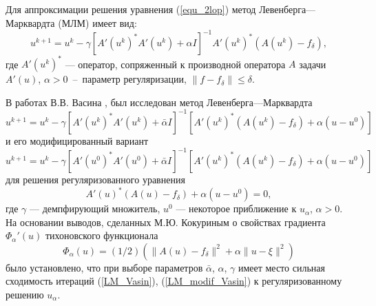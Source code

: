 Для аппроксимации решения уравнения (\ref{equ_2lop}) метод Левенберга---Марквардта (МЛМ) имеет вид:
\begin{equation}
u^{k+1}=u^k-\gamma[A'(u^k)^*A'(u^k)+\alpha I]^{-1} A'(u^k)^*(A(u^k)-f_\delta),
\end{equation}
где $A'(u^k)^*$ --- оператор, сопряженный к производной оператора $A$ задачи $A'(u)$, $\alpha>0$~--~параметр регуляризации, $\|f-f_\delta\|\le \delta.$
 
В работах В.В. Васина \cite{Vasin_2012}, \cite{VasPer_2011} был исследован метод Левенберга---Марквардта
\begin{equation}\label{LM_Vasin}
u^{k+1}=u^k-\gamma[A'(u^k)^*A'(u^k)+\bar{\alpha} I]^{-1} [A'(u^k)^*(A(u^k)-f_\delta)+\alpha (u-u^0)]
\end{equation} и его модифицированный вариант
\begin{equation}\label{LM_modif_Vasin}
u^{k+1}=u^k-\gamma[A'(u^0)^*A'(u^0)+\bar{\alpha} I]^{-1} [A'(u^k)^*(A(u^k)-f_\delta)+\alpha (u-u^0)]
\end{equation} для решения регуляризованного уравнения
$$A'(u)^*(A(u)-f_\delta)+	\alpha (u-u^0)=0,$$
где $\gamma$ --- демпфирующий множитель, $u^0$ --- некоторое приближение к $u_\alpha$, $\alpha>0$. На основании выводов, сделанных М.Ю. Кокуриным \cite{Kok_2010} о свойствах градиента $\Phi_\alpha '(u)$ тихоновского функционала $$\Phi_\alpha(u)=(1/2)(\|A(u)-f_\delta\|^2+\alpha\|u-\xi\|^2)$$ было установлено, что при выборе параметров $\bar{\alpha}$, $\alpha$, $\gamma$ имеет место сильная сходимость итераций (\ref{LM_Vasin}), (\ref{LM_modif_Vasin}) к регуляризованному решению $u_\alpha$.

